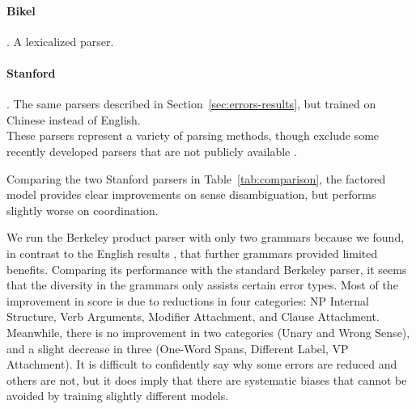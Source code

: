\paragraph{Bikel} \parencite{Bikel-Chiang:2000:CLP}.
A lexicalized parser.

\paragraph{Stanford} \parencite{Levy-Manning:2003:ACL,Klein-Manning:2003:ACL,Klein-Manning:2003:NIPS}.
The same parsers described in Section~\ref{sec:errors-results}, but trained on Chinese instead of English. \\

These parsers represent a variety of parsing methods, though exclude some recently developed parsers that are not publicly available \parencite{Qian-Liu:2012:EMNLP,Xiong-etal:2005:IJCNLP}.

Comparing the two Stanford parsers in Table~\ref{tab:comparison}, the factored
model provides clear improvements on sense disambiguation, but performs
slightly worse on coordination.

We run the Berkeley product parser with only two grammars because we found, in contrast to the English results \parencite{Petrov:2010:NAACLHLT}, that further grammars provided limited benefits.
Comparing its performance with the
standard Berkeley parser, it seems that the diversity in the grammars only
assists certain error types.
Most of the improvement in score is due to reductions in four categories: NP Internal Structure, Verb Arguments, Modifier Attachment, and Clause Attachment.
Meanwhile, there is no improvement in two categories (Unary and Wrong Sense), and a slight decrease in three (One-Word Spans, Different Label, VP Attachment).
It is difficult to confidently say why some errors are reduced and others are not, but it does imply that there are systematic biases that cannot be avoided by training slightly different models.

